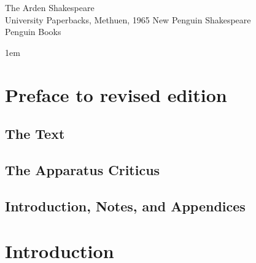 \documentclass{book}
\begin{document}
              {
                           {The Arden Shakespeare\\[.5ex]
                             University Paperbacks, Methuen, 1965}
                           {New Penguin Shakespeare\\[.5ex]
                             Penguin Books}
              }



\parindent 1em 

\chapter [Reviser's preface]{Preface to revised edition}

\noindent\lorem[32421] 

\section {The Text}

\noindent\lorem[41322] 

\section {The Apparatus Criticus}

\noindent\lorem[3225] 

\section {Introduction, Notes, and Appendices}

\noindent\lorem[3422] 

\chapter {Introduction}

\noindent\lorem[223113] 


\end{document}
